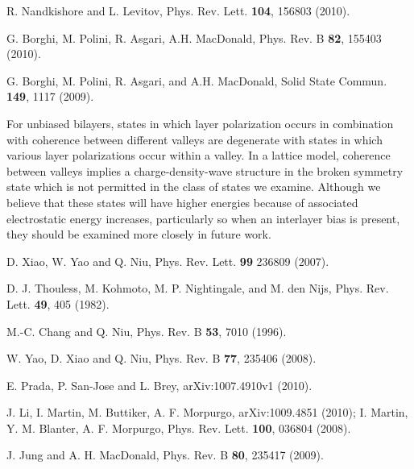 \documentclass[twocolumn,prb,showpacs,preprintnumbers,amsmath,amssymb]{revtex4}
\begin{document}
\begin{thebibliography}{99}
R. Nandkishore and L. Levitov, Phys. Rev. Lett. {\bf 104}, 156803 (2010).


G. Borghi, M. Polini, R. Asgari, A.H. MacDonald,
Phys. Rev. B {\bf 82}, 155403 (2010).

  G. Borghi, M. Polini, R. Asgari, and A.H. MacDonald, 
Solid State Commun. {\bf 149}, 1117 (2009).

 For unbiased bilayers, states in which 
layer polarization occurs in combination with coherence between different 
valleys are degenerate with states in which various layer polarizations 
occur within a valley.  In a lattice model, coherence between valleys implies 
a charge-density-wave structure in the broken symmetry state which is 
not permitted in the class of states we examine.  Although we believe that these 
states will have higher energies because of associated electrostatic energy 
increases, particularly so when an interlayer bias is present, they should be 
examined more closely in future work.
%

D. Xiao, W. Yao and Q. Niu, Phys. Rev. Lett. {\bf 99} 236809 (2007).

D. J. Thouless, M. Kohmoto, M. P. Nightingale, and
M. den Nijs, Phys. Rev. Lett. {\bf 49}, 405 (1982).

M.-C. Chang and Q. Niu,
Phys. Rev. B {\bf 53}, 7010 (1996).


 
 
W. Yao, D. Xiao and Q. Niu,
Phys. Rev. B {\bf 77}, 235406 (2008).


E. Prada, P. San-Jose and L. Brey,
arXiv:1007.4910v1 (2010).

J. Li, I. Martin, M. Buttiker, A. F. Morpurgo,
arXiv:1009.4851 (2010);
I. Martin, Y. M. Blanter, A. F. Morpurgo,
Phys. Rev. Lett. {\bf 100}, 036804 (2008). 



J. Jung and A. H. MacDonald,
Phys. Rev. B {\bf 80}, 235417 (2009).


\end{thebibliography}
\end{document}

